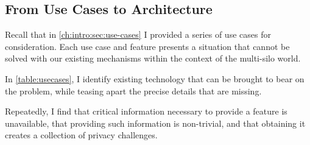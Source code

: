 \subsection{From Use Cases to Architecture}

Recall that in \autoref{ch:intro:sec:use-cases} I provided a series of use cases
for consideration. Each use case and feature presents a situation that cannot be
solved with our existing mechanisms within the context of the multi-silo world.

In \autoref{table:usecases}, I identify existing technology that can be brought to
bear on the problem, while teasing apart the precise details that are missing.

Repeatedly, I find that critical information necessary to provide a feature is
unavailable, that providing such information is non-trivial, and that obtaining
it creates a collection of privacy challenges.

